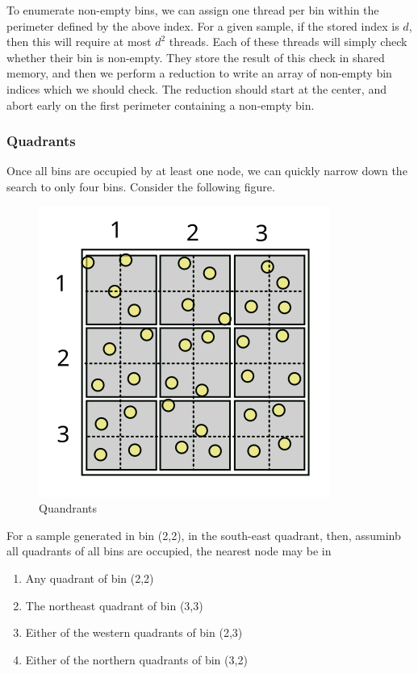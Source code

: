 To enumerate non-empty bins, we can assign one thread per bin within the perimeter defined by the above index. For a given sample, if the stored index is $d$, then this will require at most $d^2$ threads. Each of these threads will simply check whether their bin is non-empty. They store the result of this check in shared memory, and then we perform a reduction to write an array of non-empty bin indices which we should check. The reduction should start at the center, and abort early on the first perimeter containing
 a non-empty bin.


\subsubsection{Quadrants}

Once all bins are occupied by at least one node, we can quickly narrow down the search to only four bins. Consider the following figure.

\begin{figure}[H]
\begin{centering}
    \includegraphics[scale=1]{fig/nonempty_full_quad}
    \caption{Quandrants}
\end{centering} 
\end{figure}

For a sample generated in bin (2,2), in the south-east quadrant, then, assuminb all quadrants of all bins are occupied, the nearest node may be in 

\begin{enumerate}
    \item Any quadrant of bin (2,2)
    \item The northeast quadrant of bin (3,3)
    \item Either of the western quadrants of bin (2,3)
    \item Either of the northern quadrants of bin (3,2)
\end{enumerate}

